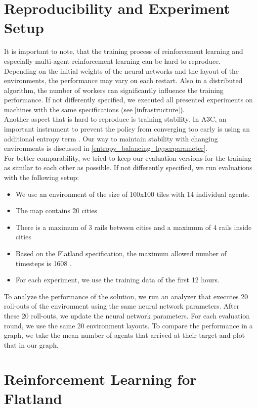 \section[Reproducibility]{Reproducibility and Experiment Setup}\label{reproducability}
It is important to note, that the training process of reinforcement learning and especially multi-agent reinforcement learning can be hard to reproduce. Depending on the initial weights of the neural networks and the layout of the environments, the performance may vary on each restart. Also in a distributed algorithm, the number of workers can significantly influence the training performance. If not differently specified, we executed all presented experiments on machines with the same specifications (see \autoref{infrastructure}).\\
Another aspect that is hard to reproduce is training stability. In A3C, an important instrument to prevent the policy from converging too early is using an additional entropy term \cite{a3c}. Our way to maintain stability with changing environments is discussed in \autoref{entropy_balancing_hyperparameter}.\\
For better comparability, we tried to keep our evaluation versions for the training as similar to each other as possible. If not differently specified, we run evaluations with the following setup:
\begin{itemize}
	\item We use an environment of the size of 100x100 tiles with 14 individual agents.
	\item The map contains 20 cities
	\item There is a maximum of 3 rails between cities and a maximum of 4 rails inside cities
	\item Based on the Flatland specification, the maximum allowed number of timesteps is 1608 \cite{flatland_spec}.
	\item For each experiment, we use the training data of the first 12 hours.
\end{itemize}
To analyze the performance of the solution, we run an analyzer that executes 20 roll-outs of the environment using the same neural network parameters. After these 20 roll-outs, we update the neural network parameters. For each evaluation round, we use the same 20 environment layouts.
To compare the performance in a graph, we take the mean number of agents that arrived at their target and plot that in our graph.
\section{Reinforcement Learning for Flatland}
\label{rl_flatland}
